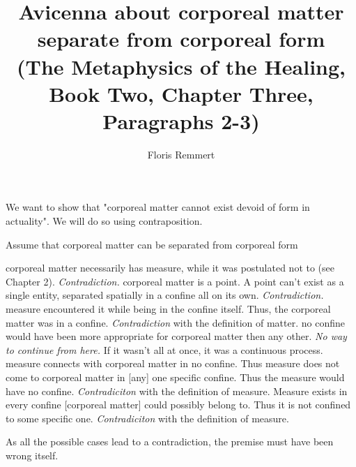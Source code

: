 \documentclass[a4paper]{article}
\title{Avicenna about corporeal matter separate from corporeal form\\\small{(The Metaphysics of the Healing, Book Two, Chapter Three, Paragraphs 2-3)}}
\author{Floris Remmert}
\begin{document}
\maketitle

%
We want to show that "corporeal matter cannot exist devoid of form in actuality". We will do so using contraposition.\\
\begin{algorithm}[H]
	\caption{Assume that corporeal matter can be separated from corporeal form}
		{
			{corporeal matter necessarily has measure, while it was postulated not to (see Chapter 2). \emph{Contradiction.}}
			{corporeal matter is a point. A point can't exist as a single entity, separated spatially in a confine all on its own. \emph{Contradiction.}}}
		{
			{
				{measure encountered it while being in the confine itself. Thus, the corporeal matter was in a confine. \emph{Contradiction} with the definition of matter.}
				{no confine would have been more appropriate for corporeal matter then any other. \emph{No way to continue from here.}}}
			{If it wasn't all at once, it was a continuous process. \\
				{measure connects with corporeal matter in no confine. Thus measure does not come to corporeal matter in [any] one specific confine. Thus the measure would have no confine. \emph{Contradiciton} with the definition of measure.}
				{Measure exists in every confine [corporeal matter] could possibly belong to. Thus it is not confined to some specific one. \emph{Contradiciton} with the definition of measure.}}}
\end{algorithm}
As all the possible cases lead to a contradiction, the premise must have been wrong itself.
\end{document}
